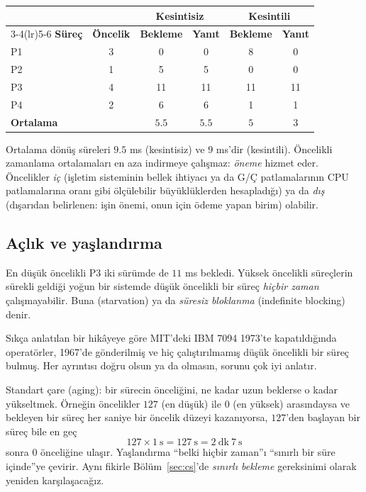 \begin{center}
\renewcommand{\arraystretch}{1.2}
\begin{tabular}{@{}lccccc@{}}
\toprule
& & \multicolumn{2}{c}{\textbf{Kesintisiz}} & \multicolumn{2}{c}{\textbf{Kesintili}}\\
\cmidrule(lr){3-4}\cmidrule(lr){5-6}
\textbf{Süreç} & \textbf{Öncelik} & \textbf{Bekleme} & \textbf{Yanıt} & \textbf{Bekleme} & \textbf{Yanıt}\\
\midrule
P1 & 3 & 0 & 0 & 8 & 0\\
P2 & 1 & 5 & 5 & 0 & 0\\
P3 & 4 & 11 & 11 & 11 & 11\\
P4 & 2 & 6 & 6 & 1 & 1\\
\midrule
\textbf{Ortalama} & & $5.5$ & $5.5$ & $5$ & $3$\\
\bottomrule
\end{tabular}
\end{center}

Ortalama dönüş süreleri $9.5$ ms (kesintisiz) ve $9$ ms'dir (kesintili). Öncelikli zamanlama ortalamaları en aza indirmeye çalışmaz: \emph{öneme} hizmet eder. Öncelikler \emph{iç} (işletim sisteminin bellek ihtiyacı ya da G/Ç patlamalarının CPU patlamalarına oranı gibi ölçülebilir büyüklüklerden hesapladığı) ya da \emph{dış} (dışarıdan belirlenen: işin önemi, onun için ödeme yapan birim) olabilir.

\subsection{Açlık ve yaşlandırma}

En düşük öncelikli P3 iki sürümde de $11$ ms bekledi. Yüksek öncelikli süreçlerin sürekli geldiği yoğun bir sistemde düşük öncelikli bir süreç \emph{hiçbir zaman} çalışmayabilir. Buna  (starvation) ya da \emph{süresiz bloklanma} (indefinite blocking) denir.

\begin{histnote}
Sıkça anlatılan bir hikâyeye göre MIT'deki IBM 7094 1973'te kapatıldığında operatörler, 1967'de gönderilmiş ve hiç çalıştırılmamış düşük öncelikli bir süreç bulmuş. Her ayrıntısı doğru olsun ya da olmasın, sorunu çok iyi anlatır.
\end{histnote}

Standart çare  (aging): bir sürecin önceliğini, ne kadar uzun beklerse o kadar yükseltmek. Örneğin öncelikler $127$ (en düşük) ile $0$ (en yüksek) arasındaysa ve bekleyen bir süreç her saniye bir öncelik düzeyi kazanıyorsa, $127$'den başlayan bir süreç bile en geç
\[
127 \times 1\ \text{s} = 127\ \text{s} = 2\ \text{dk}\ 7\ \text{s}
\]
sonra $0$ önceliğine ulaşır. Yaşlandırma ``belki hiçbir zaman''ı ``sınırlı bir süre içinde''ye çevirir. Aynı fikirle Bölüm~\ref{sec:cs}'de \emph{sınırlı bekleme} gereksinimi olarak yeniden karşılaşacağız.

